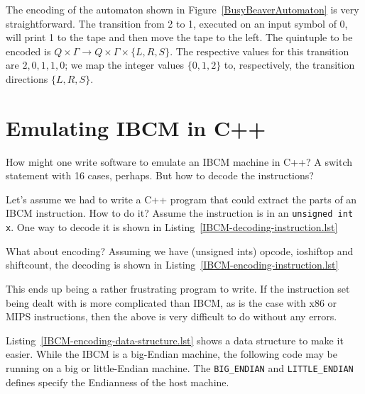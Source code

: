 
The encoding of the automaton shown in
Figure~\ref{BusyBeaverAutomaton} is very straightforward.  The
transition from 2 to 1, executed on an input symbol of 0, will print 1
to the tape and then move the tape to the left.  The quintuple to be
encoded is $Q \times \Gamma \rightarrow Q \times \Gamma \times
\{L,R,S\}$.  The respective values for this transition are
$2,0,1,1,0$; we map the integer values $\{0,1,2\}$ to, respectively,
the transition directions $\{L,R,S\}$.


\section{Emulating IBCM in C++}

How might one write software to emulate an IBCM machine in C++?  A
switch statement with 16 cases, perhaps.  But how to decode the
instructions?

Let's assume we had to write a C++ program that could extract the
parts of an IBCM instruction.  How to do it?  Assume the instruction
is in an {\tt unsigned int x}.  One way to decode it is shown in
Listing~\ref{IBCM-decoding-instruction.lst}



What about encoding?  Assuming we have (unsigned ints) opcode,
ioshiftop and shiftcount, the decoding is shown in Listing~\ref{IBCM-encoding-instruction.lst}



This ends up being a rather frustrating program to write.  If the
instruction set being dealt with is more complicated than IBCM, as is
the case with x86 or MIPS instructions, then the above is very
difficult to do without any errors.

Listing~\ref{IBCM-encoding-data-structure.lst} shows a data structure
to make it easier.  While the IBCM is a big-Endian machine, the
following code may be running on a big or little-Endian machine.  The
{\tt BIG\_ENDIAN} and {\tt LITTLE\_ENDIAN} defines specify the
Endianness of the host machine.

